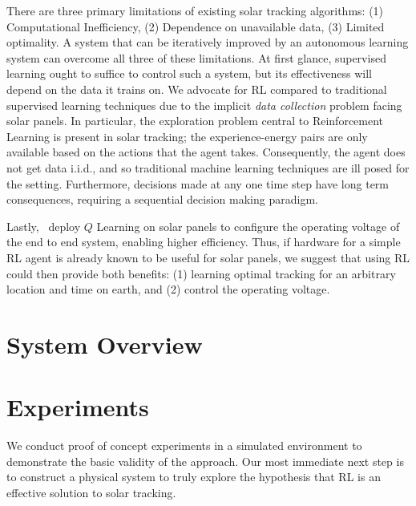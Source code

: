 \documentclass[11pt]{article}
\begin{document}
There are three primary limitations of existing solar tracking algorithms: (1) Computational Inefficiency, (2) Dependence on unavailable data, (3) Limited optimality. A system that can be iteratively improved by an autonomous learning system can overcome all three of these limitations. At first glance, supervised learning ought to suffice to control such a system, but its effectiveness will depend on the data it trains on. We advocate for RL compared to traditional supervised learning techniques due to the implicit {\it data collection} problem facing solar panels. In particular, the exploration problem central to Reinforcement Learning is present in solar tracking; the experience-energy pairs are only available based on the actions that the agent takes. Consequently, the agent does not get data i.i.d., and so traditional machine learning techniques are ill posed for the setting. Furthermore, decisions made at any one time step have long term consequences, requiring a sequential decision making paradigm.

Lastly,~\citet{Hsu2015} deploy $Q$ Learning on solar panels to configure the operating voltage of the end to end system, enabling higher efficiency. Thus, if hardware for a simple RL agent is already known to be useful for solar panels, we suggest that using RL could then provide both benefits: (1) learning optimal tracking for an arbitrary location and time on earth, and (2) control the operating voltage. \\



\section{System Overview}



\section{Experiments}

We conduct proof of concept experiments in a simulated environment to demonstrate the basic validity of the approach. Our most immediate next step is to construct a physical system to truly explore the hypothesis that RL is an effective solution to solar tracking. \\
\end{document}
